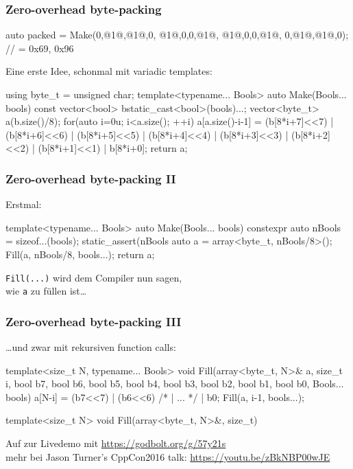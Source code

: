 \documentclass[t,ngerman,usepdftitle=false]{beamer}
\begin{document}
\begin{frame}[fragile]
  \frametitle{Zero-overhead byte-packing}
  \begin{cpplisting}
auto packed = Make(0,@1@,@1@,0,
                   @1@,0,0,@1@,	
                   @1@,0,0,@1@,
                   0,@1@,@1@,0); // = {0x69, 0x96}
  \end{cpplisting}

\pause
Eine erste Idee, schonmal mit variadic templates:
\lstset{firstnumber=5}
\begin{cpplisting}
using byte_t = unsigned char;
template<typename... Bools>
auto Make(Bools... bools) {
  const vector<bool> b{static_cast<bool>(bools)...};
  vector<byte_t> a(b.size()/8);
  for(auto i=0u; i<a.size(); ++i)
    a[a.size()-i-1] = (b[8*i+7]<<7) | (b[8*i+6]<<6) 
                    | (b[8*i+5]<<5) | (b[8*i+4]<<4) 
                    | (b[8*i+3]<<3) | (b[8*i+2]<<2) 
                    | (b[8*i+1]<<1) |  b[8*i+0];
  return a;
}
\end{cpplisting}
  
\end{frame}

\begin{frame}[fragile]
  \frametitle{Zero-overhead byte-packing II}
  
Erstmal: 
\begin{cpplisting}
template<typename... Bools>
auto Make(Bools... bools) {
  constexpr auto nBools = sizeof...(bools);
  static_assert(nBools %
  auto a = array<byte_t, nBools/8>();
  Fill(a, nBools/8, bools...);
  return a;
}
\end{cpplisting}

\lstinline|Fill(...)| wird dem Compiler nun sagen, \\ wie \lstinline|a| zu füllen ist\ldots

\end{frame}

\begin{frame}[fragile]
  \frametitle{Zero-overhead byte-packing III}

\ldots{}und zwar mit rekursiven function calls:
\begin{cpplisting}
template<size_t N, typename... Bools>
void Fill(array<byte_t, N>& a,
          size_t i,
          bool b7, bool b6, bool b5, bool b4,
          bool b3, bool b2, bool b1, bool b0,
          Bools... bools) {
  a[N-i] = (b7<<7) | (b6<<6) /* | ... */ | b0;
  Fill(a, i-1, bools...);
}

template<size_t N>
void Fill(array<byte_t, N>&, size_t) {}
\end{cpplisting}

\pause
\begin{block}{}
  \centering Auf zur Livedemo mit \url{https://godbolt.org/g/57y21s}\\
  {\small mehr bei Jason Turner's CppCon2016 talk: \url{https://youtu.be/zBkNBP00wJE}}
\end{block}
    
\end{frame}
\end{document}
